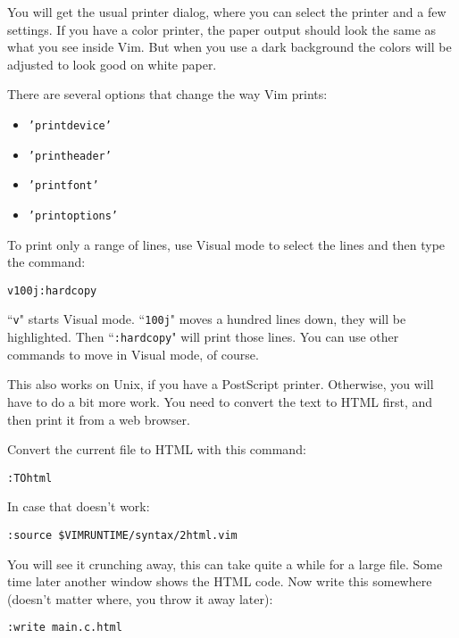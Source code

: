 You will get the usual printer dialog, where you can select the printer and a few settings.
If you have a color printer, the paper output should look the same as what you see inside Vim.
But when you use a dark background the colors will be adjusted to look good on white paper.

There are several options that change the way Vim prints:
\begin{itemize}
				\item \texttt{'printdevice'}
				\item \texttt{'printheader'}
				\item \texttt{'printfont'}
				\item \texttt{'printoptions'}
\end{itemize}

To print only a range of lines, use Visual mode to select the lines and then type the command:

 \begin{Verbatim}[samepage=true]
 v100j:hardcopy
 \end{Verbatim}

``\texttt{v}" starts Visual mode.
``\texttt{100j}" moves a hundred lines down, they will be highlighted.
Then ``\texttt{:hardcopy}" will print those lines.
You can use other commands to move in Visual mode, of course.

This also works on Unix, if you have a PostScript printer.
Otherwise, you will have to do a bit more work.
You need to convert the text to HTML first, and then print it from a web browser.

Convert the current file to HTML with this command:

 \begin{Verbatim}[samepage=true]
 :TOhtml
 \end{Verbatim}

In case that doesn't work:

 \begin{Verbatim}[samepage=true]
 :source $VIMRUNTIME/syntax/2html.vim
 \end{Verbatim}

You will see it crunching away, this can take quite a while for a large file.
Some time later another window shows the HTML code.
Now write this somewhere (doesn't matter where, you throw it away later):

 \begin{Verbatim}[samepage=true]
 :write main.c.html
 \end{Verbatim}

